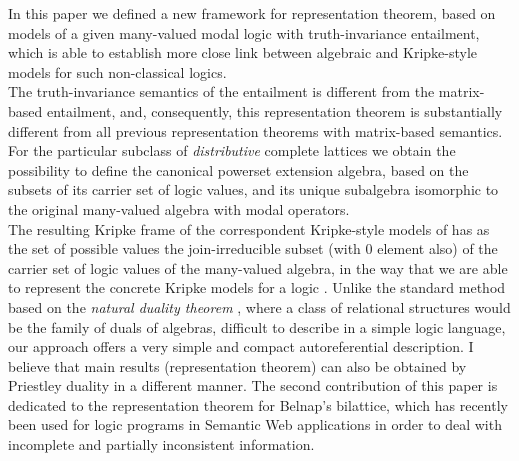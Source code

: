 \documentclass[10pt,twocolumn]{article}
\begin{document}
In this paper we defined a new framework for representation theorem,
based on models of a given many-valued modal logic  with
truth-invariance entailment, which is able to establish more close
link between algebraic and Kripke-style
  models for such non-classical logics.\\
The truth-invariance semantics of the entailment is different from
the matrix-based entailment, and, consequently,  this representation
theorem is substantially different from all previous representation
theorems with matrix-based
semantics.\\
 For the particular subclass of \emph{distributive} complete lattices we obtain  the possibility to define the canonical powerset extension algebra,
 based on the subsets of its carrier set of logic values, and its unique subalgebra
 isomorphic to the original many-valued algebra with modal
 operators.\\
 The resulting Kripke frame of the correspondent Kripke-style
 models of  has as the set of possible values the join-irreducible subset (with 0 element also)  of the carrier set of logic values
  of the many-valued algebra, in the way that we are able to represent the concrete Kripke models for a logic
 . Unlike the standard method based on the \emph{natural
 duality theorem} \cite{ClDa98}, where a class  of relational structures would
 be the family of duals of algebras,  difficult to describe in a
 simple logic language, our approach offers a very {simple and compact}
 autoreferential description. I believe that main results (representation theorem) can also be
obtained by Priestley duality in a different manner.
 The second contribution of this paper is
 dedicated to the representation theorem for Belnap's bilattice,
 which has recently been used for logic programs in Semantic Web applications \cite{MajkA04} in order to deal with incomplete
 and partially inconsistent information.



\end{document}

